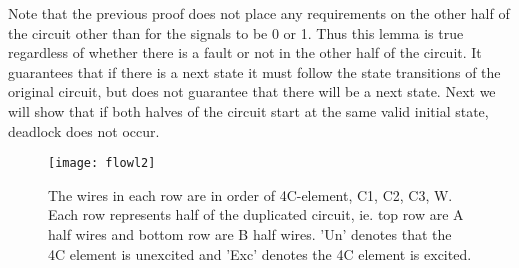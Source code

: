\documentclass{article}
\begin{document}
Note that the previous proof does not place any requirements on the other half of the circuit other than for the signals to be 0 or 1.  Thus this lemma is true regardless of whether there is a fault or not in the other half of the circuit.  It guarantees that if there is a next state it must follow the state transitions of the original circuit, but does not guarantee that there will be a next state.  Next we will show that if both halves of the circuit start at the same valid initial state, deadlock does not occur.

\begin{figure}
  \centering
    \texttt{[image: flowl2]}
  \caption{The wires in each row are in order of 4C-element, C1, C2, C3, W.  Each row represents half of the duplicated circuit, ie. top row are A half wires and bottom row are B half wires.  'Un' denotes that the 4C element is unexcited and 'Exc' denotes the 4C element is excited.  }
\end{figure}
\end{document}
